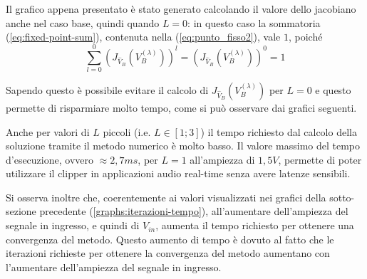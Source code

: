 			Il grafico appena presentato è stato generato calcolando il valore dello jacobiano anche nel caso base, quindi quando $L = 0$: in questo caso la sommatoria (\ref{eq:fixed-point-sum}), contenuta nella (\ref{eq:punto_fisso2}), vale $1$, poiché
			\[
				\sum_{l=0}^{0} \left(J_{\widehat V_{B}}(V_{B}^{(\lambda)})\right)^{l} = \left(J_{\widehat V_{B}}(V_{B}^{(\lambda)})\right)^{0} = 1
			\]
			
			Sapendo questo è possibile evitare il calcolo di $J_{\widehat V_{B}}(V_{B}^{(\lambda)})$ per $L = 0$ e questo permette di risparmiare molto tempo, come si può osservare dai grafici seguenti.
			
			\graficospace
			\graficospace
			\graficospace
			\graficospace
			\graficospace
			
			Anche per valori di $L$ piccoli (i.e. $L \in [1;3]$) il tempo richiesto dal calcolo della soluzione tramite il metodo numerico è molto basso. Il valore massimo del tempo d'esecuzione, ovvero $\approx 2,7ms$, per $L = 1$ all'ampiezza di $1,5V$, permette di poter utilizzare il clipper in applicazioni audio real-time senza avere latenze sensibili.
			
			Si osserva inoltre che, coerentemente ai valori visualizzati nei grafici della sotto-sezione precedente (\ref{graphs:iterazioni-tempo}), all'aumentare dell'ampiezza del segnale in ingresso, e quindi di $V_{in}$, aumenta il tempo richiesto per ottenere una convergenza del metodo. Questo aumento di tempo è dovuto al fatto che le iterazioni richieste per ottenere la convergenza del metodo aumentano con l'aumentare dell'ampiezza del segnale in ingresso.